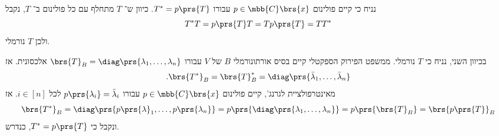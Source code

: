 \documentclass[a4paper,10pt,twoside,openany]{book}
\begin{document}
\begin{solution}
נניח כי קיים פולינום
$p \in \mbb{C}\brs{x}$
עבורו
$T^* = p\prs{T}$.
כיוון ש־%
$T$
מתחלף עם כל פולינום ב־%
$T$,
נקבל
\[T^* T = p\prs{T} T = T p\prs{T} = T T^*\]
ולכן
$T$
נורמלי.

בכיוון השני, נניח כי
$T$
נורמלי.
ממשפט הפירוק הספקטלי קיים בסיס אורתונורמלי
$B$
של
$V$
עבורו
$\brs{T}_B = \diag\prs{\lambda_1, \ldots, \lambda_n}$
אלכסונית.
אז
\[\text{.} \brs{T^*}_B = \brs{T}_B^* = \diag\prs{\bar{\lambda}_1, \ldots, \bar{\lambda}_n}\]
מאינטרפולציית לגרנג', קיים פולינום
$p \in \mbb{C}\brs{x}$
עבורו
$p\prs{\lambda_i} = \bar{\lambda}_i$
לכל
$i \in [n]$.
אז
\[\brs{T^*}_B = \diag\prs{p\prs{\lambda}_1, \ldots, p\prs{\lambda_n}} = p\prs{\diag\prs{\lambda_1, \ldots, \lambda_n}} = p\prs{\brs{T}_B} = \brs{p\prs{T}}_B\]
ונקבל כי
$T^* = p\prs{T}$,
כנדרש.
\end{solution}




\end{document}
